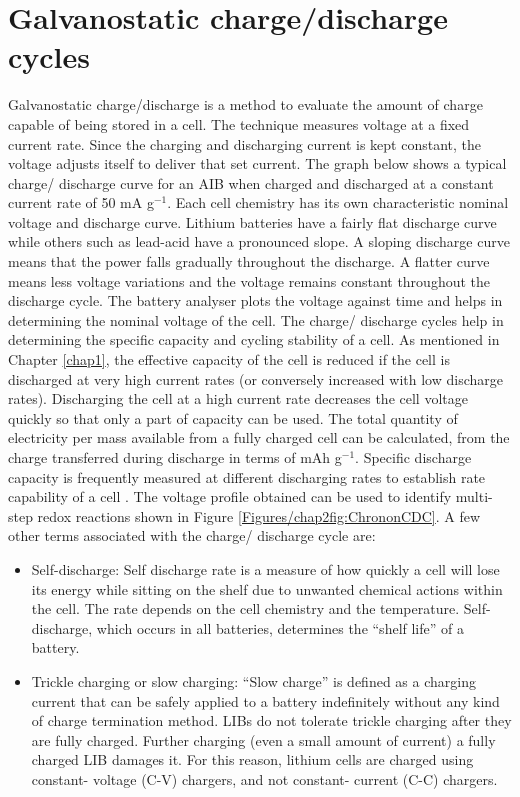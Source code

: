 \section{Galvanostatic charge/discharge cycles}
Galvanostatic charge/discharge is a method to evaluate the amount of charge capable of being stored in a cell. The technique measures voltage at a fixed current rate. Since the charging and discharging current is kept constant, the voltage adjusts itself to deliver that set current. The graph below shows a typical charge/ discharge curve for an AIB when charged and discharged at a constant current rate of 50 mA g$^{-1}$. Each cell chemistry has its own characteristic nominal voltage and discharge curve. Lithium batteries have a fairly flat discharge curve while others such as lead-acid have a pronounced slope. A sloping discharge curve means that the power falls gradually throughout the discharge. A flatter curve means less voltage variations and the voltage remains constant throughout the discharge cycle. The battery analyser plots the voltage against time and helps in determining the nominal voltage of the cell. The charge/ discharge cycles help in determining the specific capacity and cycling stability of a cell. As mentioned in Chapter \ref{chap1}, the effective capacity of the cell is reduced if the cell is discharged at very high current rates (or conversely increased with low discharge rates). Discharging the cell at a high current rate decreases the cell voltage quickly so that only a part of capacity can be used. The total quantity of electricity per mass available from a fully charged cell can be calculated, from the charge transferred during discharge in terms of mAh g$^{-1}$. Specific discharge capacity is frequently measured at different discharging rates to establish rate capability of a cell \cite{pyun_electrochemistry_2012-1}. The voltage profile obtained can be used to identify multi-step redox reactions shown in Figure \ref{Figures/chap2fig:ChrononCDC}. A few other terms associated with the charge/ discharge cycle are:
\begin{itemize}
\item Self-discharge: Self discharge rate is a measure of how quickly a cell will lose its energy while sitting on the shelf due to unwanted chemical actions within the cell. The rate depends on the cell chemistry and the temperature. Self-discharge, which occurs in all batteries, determines the \enquote{shelf life} of a battery.
\item Trickle charging or slow charging: \enquote{Slow charge} is defined as a charging current that can be safely applied to a battery indefinitely without any kind of charge termination method. LIBs do not tolerate trickle charging after they are fully charged. Further charging (even a small amount of current) a fully charged LIB damages it. For this reason, lithium cells are charged using constant- voltage (C-V) chargers, and not constant- current (C-C) chargers.

\end{itemize}

